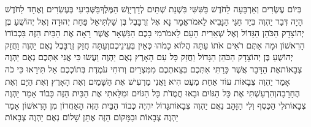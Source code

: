 \documentclass[../main/main.tex]{subfiles}
\begin{document}
\begin{multicols}{\ncols}
\pagebreak %
בְּיוֹם עֶשְׂרִים וְאַרְבָּעָה לַחֹדֶשׁ בַּשִּׁשִּׁי בִּשְׁנַת שְׁתַּיִם לְדָרְיָוֶשׁ הַמֶּלֶךְ\PreChapterSpace{}בַּשְּׁבִיעִי בְּעֶשְׂרִים וְאֶחָד לַחֹדֶשׁ הָיָה דְּבַר יַהְוֶה בְּיַד חַגַּי הַנָּבִיא לֵאמֹר\PreVerseSpace{}אֱמָר נָא אֶל זְרֻבָּבֶל בֶּן שַׁלְתִּיאֵל פַּחַת יְהוּדָה וְאֶל יְהוֹשֻׁעַ בֶּן יְהוֹצָדָק הַכֹּהֵן הַגָּדוֹל וְאֶל שְׁאֵרִית הָעָם לֵאמֹר\PreVerseSpace{}מִי בָכֶם הַנִּשְׁאָר אֲשֶׁר רָאָה אֶת הַבַּיִת הַזֶּה בִּכְבוֹדוֹ הָרִאשׁוֹן וּמָה אַתֶּם רֹאִים אֹתוֹ עַתָּה הֲלוֹא כָמֹהוּ כְּאַיִן בְּעֵינֵיכֶם\PreVerseSpace{}וְעַתָּה חֲזַק זְרֻבָּבֶל נְאֻם יַהְוֶה וַחֲזַק יְהוֹשֻׁעַ בֶּן יְהוֹצָדָק הַכֹּהֵן הַגָּדוֹל וַחֲזַק כָּל עַם הָאָרֶץ נְאֻם יַהְוֶה וַעֲשׂוּ כִּי אֲנִי אִתְּכֶם נְאֻם יַהְוֶה צְבָאוֹת\PreVerseSpace{}אֶת הַדָּבָר אֲשֶׁר כָּרַתִּי אִתְּכֶם בְּצֵאתְכֶם מִמִּצְרַיִם וְרוּחִי עֹמֶדֶת בְּתוֹכְכֶם אַל תִּירָאוּ \ClosedSection{}כִּי כֹה אָמַר יַהְוֶה צְבָאוֹת עוֹד אַחַת מְעַט הִיא וַאֲנִי מַרְעִישׁ אֶת הַשָּׁמַיִם וְאֶת הָאָרֶץ וְאֶת הַיָּם וְאֶת הֶחָרָבָה\PreVerseSpace{}וְהִרְעַשְׁתִּי אֶת כָּל הַגּוֹיִם וּבָאוּ חֲמֻדֹת\SubEnd{} כָּל הַגּוֹיִם וּמִלֵּאתִי אֶת הַבַּיִת הַזֶּה כָּבוֹד אָמַר יַהְוֶה צְבָאוֹת\PreVerseSpace{}לִי הַכֶּסֶף וְלִי הַזָּהָב נְאֻם יַהְוֶה צְבָאוֹת\PreVerseSpace{}גָּדוֹל יִהְיֶה כְּבוֹד הַבַּיִת הַזֶּה הָאַחֲרוֹן מִן הָרִאשׁוֹן אָמַר יַהְוֶה צְבָאוֹת וּבַמָּקוֹם הַזֶּה אֶתֵּן שָׁלוֹם נְאֻם יַהְוֶה צְבָאוֹת\OpenSection{}\par

\end{multicols}
\end{document}
